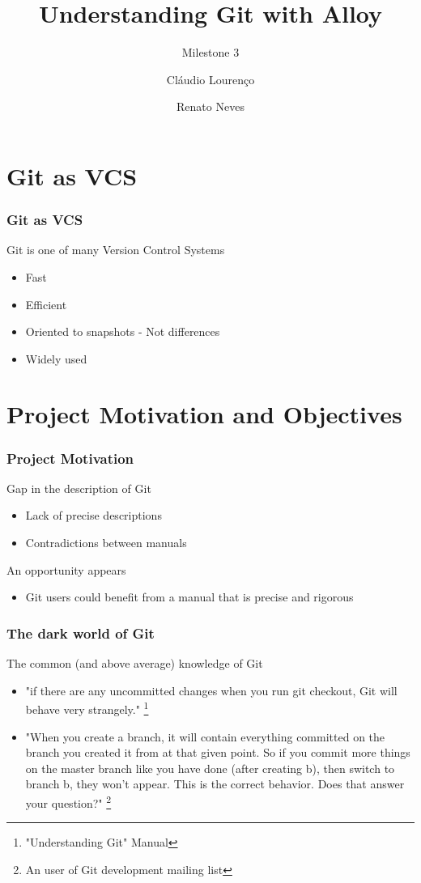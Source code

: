 \documentclass{beamer}
\title{Understanding Git with Alloy}
\subtitle{Milestone 3}
\author{Cláudio Lourenço \and Renato Neves}
\institute{University of Minho\\
Formal Methods in Software Engineering}
\begin{document}
\frame {
   \titlepage
}


\section{Git as VCS}

\begin{frame}
	\frametitle{Git as VCS}
	\begin{block}{Git is one of many Version Control Systems}
		\begin{itemize}
		\item Fast
		\item Efficient
		\item Oriented to snapshots - Not differences
		\item Widely used
	\end{itemize}
	\end{block}
\end{frame}

\section{Project Motivation and Objectives}
\begin{frame}
	\frametitle{Project Motivation}
	\begin{block}{Gap in the description of Git}
		\begin{itemize}
		\item Lack of precise descriptions
		\item Contradictions between manuals
		\end{itemize}
	\end{block}
	\begin{block}{An opportunity  appears}
	\begin{itemize}
	\item Git users could benefit from a manual that is precise and rigorous
	\end{itemize}
	\end{block}
\end{frame}

\begin{frame}
	\frametitle{The dark world of Git}
	\begin{block}{The common (and above average) knowledge of Git }
	\begin{itemize}
	\item "if there are any uncommitted changes when you run git checkout,
	 Git will behave very strangely." \footnote{"Understanding Git" Manual}
	\item "When you create a branch, it will contain everything
         committed on the branch you created it from at that given
         point. So if you commit more things on the master branch like
         you have done (after creating b), then switch to branch b,
         they won't appear. This is the correct behavior. Does that
         answer your question?" \footnote{An user of Git development 
	 mailing list} 
	\end{itemize}
	\end{block}
\end{frame}
\end{document}
